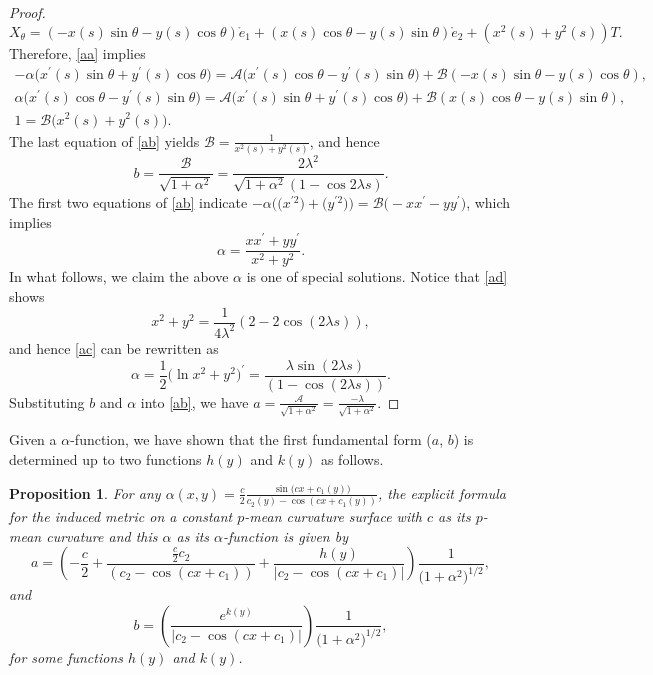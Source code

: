 \documentclass[pdftex]{sigma}
\numberwithin{equation}{section}
\newtheorem{Proposition}[Theorem]{Proposition}
\begin{document}
\begin{proof}
\begin{equation*}
X_\theta=(-x(s)\sin \theta-y(s)\cos \theta)\mathring e_1+(x(s)\cos \theta-y(s)\sin
\theta)\mathring e_2+(x^2(s)+y^2(s))T.
\end{equation*}
Therefore, \eqref{aa} implies
\begin{gather}
-\alpha\bigl(x^{\prime }(s)\sin \theta+y^{\prime }(s)\cos \theta\bigr)= \mathcal{A}\bigl(x^{\prime
}(s)\cos \theta-y^{\prime }(s)\sin \theta\bigr)+\mathcal{B}(-x(s)\sin \theta-y(s)\cos
\theta),\nonumber \\
\alpha\bigl(x^{\prime }(s)\cos \theta-y^{\prime }(s)\sin \theta\bigr)=\mathcal{A}\bigl(x^{\prime
}(s)\sin \theta+y^{\prime }(s)\cos \theta\bigr)+\mathcal{B}(x(s)\cos \theta-y(s)\sin \theta),\nonumber
\\
1=\mathcal{B}\bigl(x^2(s)+y^2(s)\bigr). \label{ab}
\end{gather}
The last equation of \eqref{ab} yields
$
\mathcal{B}=\frac{1}{x^2(s)+y^2(s)}$,
and hence
\[
b=\frac{\mathcal{B}}{\sqrt{1+\alpha^2}}=\frac{2\lambda^{2}}{\sqrt{1+\alpha^2}(1-\cos{2\lambda s})}.
\]
The first two equations of \eqref{ab} indicate
$
-\alpha\bigl(\bigl(x^{\prime 2}\bigr)+\bigl(y^{\prime 2}\bigr)\bigr)=\mathcal{B}\bigl(-xx^{\prime }-yy^{\prime }\bigr)$,
which implies
\begin{equation} \label{ac}
\alpha=\frac{xx^{\prime }+yy^{\prime }}{x^2+y^2}.
\end{equation}
In what follows, we claim the above $\alpha$ is one of special solutions.
Notice that \eqref{ad} shows
\[
x^2+y^2=\frac{1}{4\lambda^2}(2-2\cos(2\lambda s)),
\]
and hence \eqref{ac} can be rewritten as
\begin{equation*}
\alpha=\frac{1}{2}\bigl(\ln x^2+y^2\bigr)^{\prime }=\frac{\lambda \sin(2\lambda s)}{(1-\cos(2\lambda s))}.
\end{equation*}
Substituting $b$ and $\alpha$ into \eqref{ab}, we have
$
a=\frac{\mathcal{A}}{\sqrt{1+\alpha^2}}=\frac{-\lambda}{\sqrt{1+\alpha^2}}$.
\end{proof}

Given a $\alpha$-function, we have shown \cite{ChiuH/LiuH:2022} that the first fundamental form ($a$, $b$) is determined up to two functions $h(y)$ and $k(y)$ as follows.
\begin{Proposition}
\label{metricform} For any $\alpha(x,y)=\frac{c}{2}\frac{\sin{(cx+c_{1}(y)})
}{c_{2}(y)-\cos{(cx+c_{1}(y))}}$, the explicit formula for the induced
metric on a constant $p$-mean curvature surface with $c$ as its $p$-mean
curvature and this $\alpha$ as its $\alpha$-function is given by
\begin{equation*} \label{meta}
a=\left(-\frac{c}{2}+\frac{\frac{c}{2}c_{2}}{(c_{2}-\cos{(cx+c_{1})})}+\frac{
h(y)}{|c_{2}-\cos{(cx+c_{1})}|}\right)\frac{1}{\bigl(1+\alpha^{2}\bigr)^{1/2}},
\end{equation*}
and
\begin{equation*} \label{metb}
b=\left(\frac{e^{k(y)}}{|c_{2}-\cos{(cx+c_{1})}|}\right)\frac{1}{
\bigl(1+\alpha^{2}\bigr)^{1/2}},
\end{equation*}
for some functions $h(y)$ and $k(y)$.
\end{Proposition}
\end{document}
